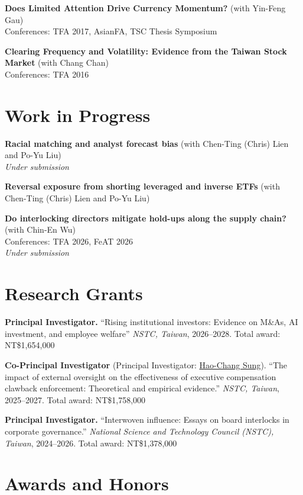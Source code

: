 \documentclass[
  english,
  margin]{res}
\begin{document}
\begin{resume}
\textbf{Does Limited Attention Drive Currency Momentum?} (with Yin-Feng
Gau)\\
Conferences: TFA 2017, AsianFA, TSC Thesis Symposium

\textbf{Clearing Frequency and Volatility: Evidence from the Taiwan
Stock Market} (with Chang Chan)\\
Conferences: TFA 2016

\section{\texorpdfstring{Work in
\newline Progress}{Work in Progress}}\label{work-in-progress}

\textbf{Racial matching and analyst forecast bias} (with Chen-Ting
(Chris) Lien and Po-Yu Liu)\\
\emph{Under submission}

\textbf{Reversal exposure from shorting leveraged and inverse ETFs}
(with Chen-Ting (Chris) Lien and Po-Yu Liu)

\textbf{Do interlocking directors mitigate hold-ups along the supply
chain?} (with Chin-En Wu)\\
Conferences: TFA 2026, FeAT 2026\\
\emph{Under submission}

\section{Research Grants}\label{research-grants}

\textbf{Principal Investigator.} ``Rising institutional investors:
Evidence on M\&As, AI investment, and employee welfare'' \emph{NSTC,
Taiwan}, 2026--2028. Total award: NT\$1,654,000

\textbf{Co-Principal Investigator} (Principal Investigator:
\href{https://busadm.ccu.edu.tw/p/405-1248-31599,c3236.php?Lang=zh-tw}{Hao-Chang
Sung}). ``The impact of external oversight on the effectiveness of
executive compensation clawback enforcement: Theoretical and empirical
evidence.'' \emph{NSTC, Taiwan}, 2025--2027. Total award: NT\$1,758,000

\textbf{Principal Investigator.} ``Interwoven influence: Essays on board
interlocks in corporate governance.'' \emph{National Science and
Technology Council (NSTC), Taiwan}, 2024--2026. Total award:
NT\$1,378,000

\section{\texorpdfstring{Awards and
\newline Honors}{Awards and Honors}}\label{awards-and-honors}


\end{resume}
\end{document}
